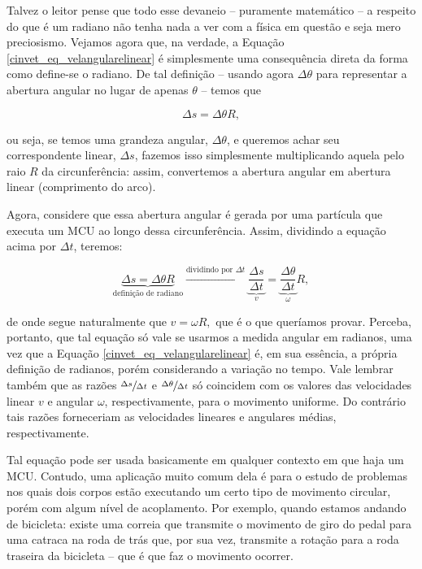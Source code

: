 Talvez o leitor pense que todo esse devaneio -- puramente matemático -- a respeito do que é um radiano não tenha nada a ver com a física em questão e seja mero preciosismo. Vejamos agora que, na verdade, a Equação \eqref{cinvet_eq_velangularelinear} é simplesmente uma consequência direta da forma como define-se o radiano. De tal definição -- usando agora $\Delta \theta$ para representar a abertura angular no lugar de apenas $\theta$ -- temos que 

$$ \Delta s = \Delta \theta R,$$

\noindent ou seja, se temos uma grandeza angular, $\Delta \theta$, e queremos achar seu correspondente linear, $\Delta s$, fazemos isso simplesmente multiplicando aquela pelo raio $R$ da circunferência: assim, convertemos a abertura angular em abertura linear (comprimento do arco).

Agora, considere que essa abertura angular é gerada por uma partícula que executa um MCU ao longo dessa circunferência. Assim, dividindo a equação acima por $\Delta t$, teremos:


$$ \underbrace{\Delta s = \Delta \theta R}_{\text{definição de radiano}} \xrightarrow{\text{dividindo por $\Delta t$}}  \underbrace{\dfrac{\Delta s}{\Delta t}}_{v} = \underbrace{\dfrac{\Delta \theta}{\Delta t}}_{\omega} R, $$


\noindent de onde segue naturalmente que $v=\omega R,$ que é o que queríamos provar. Perceba, portanto, que tal equação só vale se usarmos a medida angular em radianos, uma vez que a Equação \eqref{cinvet_eq_velangularelinear} é, em sua essência, a própria definição de radianos, porém considerando a variação no tempo. Vale lembrar também que as razões $\sfrac{\Delta s}{\Delta t}$ e $\sfrac{\Delta \theta}{\Delta t}$ só coincidem com os valores das velocidades linear $v$ e angular $\omega$, respectivamente, para o movimento uniforme. Do contrário tais razões forneceriam as velocidades lineares e angulares médias, respectivamente.


Tal equação pode ser usada basicamente em qualquer contexto em que haja um MCU. Contudo, uma aplicação muito comum dela é para o estudo de problemas nos quais dois corpos estão executando um certo tipo de movimento circular, porém com algum nível de acoplamento. Por exemplo, quando estamos andando de bicicleta: existe uma correia que transmite o movimento de giro do pedal para uma catraca na roda de trás que, por sua vez, transmite a rotação para a roda traseira da bicicleta -- que é que faz o movimento ocorrer.

